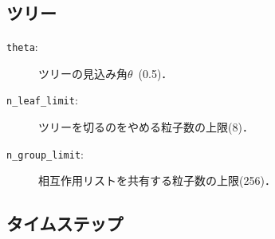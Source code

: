 \documentclass[12pt,a4paper,dvipdfmx]{jsarticle}
\begin{document}
\subsection{ツリー}
\begin{description}
\item[\texttt{theta}:]
ツリーの見込み角$\theta$\ (0.5)．
\item[\texttt{n\_leaf\_limit}:]
ツリーを切るのをやめる粒子数の上限(8)．
\item[\texttt{n\_group\_limit}:]
相互作用リストを共有する粒子数の上限(256)．
\end{description}

\subsection{タイムステップ\label{timestep}}
\end{document}
